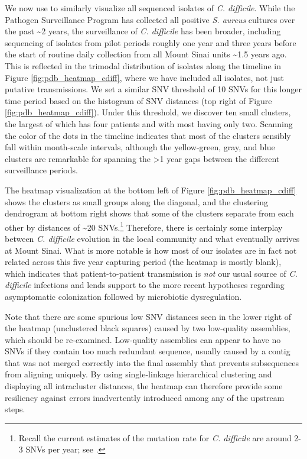 We now use \pathogendbviz{} to similarly visualize all sequenced isolates of \emph{C. difficile}. While the Pathogen Surveillance Program has collected all positive \emph{S. aureus} cultures over the past \textasciitilde{}2 years, the surveillance of \emph{C. difficile} has been broader, including sequencing of isolates from pilot periods roughly one year and three years before the start of routine daily collection from all Mount Sinai units \textasciitilde{}1.5 years ago. This is reflected in the trimodal distribution of isolates along the timeline in Figure \ref{fig:pdb_heatmap_cdiff}, where we have included all isolates, not just putative transmissions. We set a similar SNV threshold of 10 SNVs for this longer time period based on the histogram of SNV distances (top right of Figure \ref{fig:pdb_heatmap_cdiff}). Under this threshold, we discover ten small clusters, the largest of which has four patients and with most having only two. Scanning the color of the dots in the timeline indicates that most of the clusters sensibly fall within month-scale intervals, although the yellow-green, gray, and blue clusters are remarkable for spanning the >1 year gaps between the different surveillance periods.

The heatmap visualization at the bottom left of Figure \ref{fig:pdb_heatmap_cdiff} shows the clusters as small groups along the diagonal, and the clustering dendrogram at bottom right shows that some of the clusters separate from each other by distances of \textasciitilde{}20 SNVs.\footnote{Recall the current estimates of the mutation rate for \emph{C. difficile} are around 2-3 SNVs per year; see \textcite{Eyre2013,Price2014,Eyre2012}.} Therefore, there is certainly some interplay between \emph{C. difficile} evolution in the local community and what eventually arrives at Mount Sinai. What is more notable is how most of our isolates are in fact not related across this five year capturing period (the heatmap is mostly blank), which indicates that patient-to-patient transmission is \emph{not} our usual source of \emph{C. difficile} infections and lends support to the more recent hypotheses regarding asymptomatic colonization followed by microbiotic dysregulation.\autocite{Weingarden2015,Bagdasarian2015}

Note that there are some spurious low SNV distances seen in the lower right of the heatmap (unclustered black squares) caused by two low-quality assemblies, which should be re-examined. Low-quality assemblies can appear to have no SNVs if they contain too much redundant sequence, usually caused by a contig that was not merged correctly into the final assembly that prevents subsequences from aligning uniquely. By using single-linkage hierarchical clustering and displaying all intracluster distances, the heatmap can therefore provide some resiliency against errors inadvertently introduced among any of the upstream steps.

